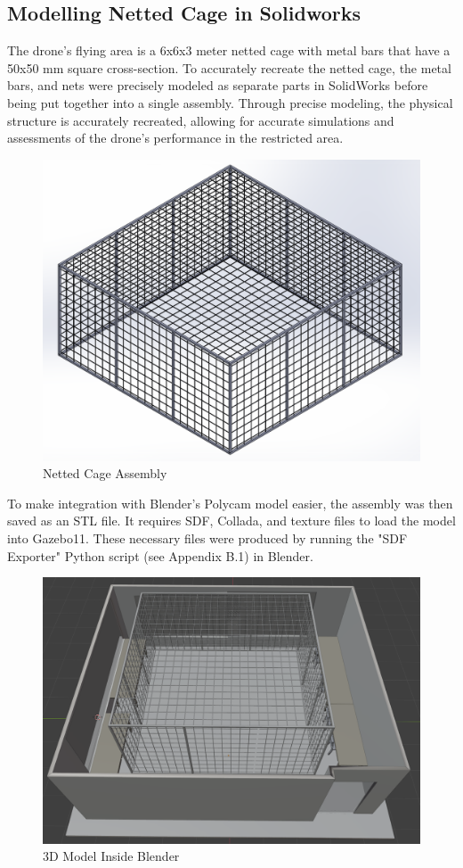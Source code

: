         \subsection{Modelling Netted Cage in Solidworks}
        \color{black}
        The drone's flying area is a 6x6x3 meter netted cage with metal bars that have a 50x50 mm square cross-section. To accurately recreate the netted cage, the metal bars, and nets were precisely modeled as separate parts in SolidWorks before being put together into a single assembly. Through precise modeling, the physical structure is accurately recreated, allowing for accurate simulations and assessments of the drone's performance in the restricted area.
        \begin{figure}[H]
            \centering
            \includegraphics[width=0.6\linewidth]{Images/net.png}
            \caption{Netted Cage Assembly}
            \label{cage}
        \end{figure}
        To make integration with Blender's Polycam model easier, the assembly was then saved as an STL file. It requires SDF, Collada, and texture files to load the model into Gazebo11. These necessary files were produced by running the "SDF Exporter" Python script (see Appendix B.1) in Blender.
        \begin{figure}[H]
            \centering
            \includegraphics[width=0.6\linewidth]{Images/Blender.png}
            \caption{3D Model Inside Blender}
            \label{blender}
        \end{figure}

